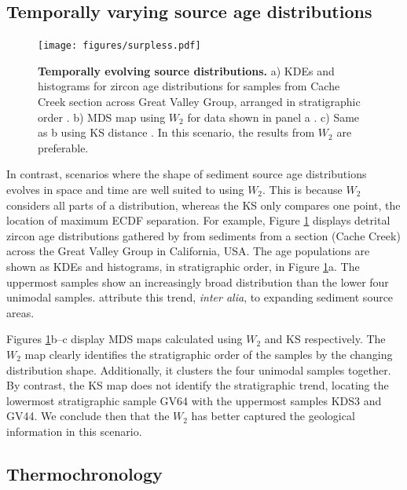 \documentclass[gchron, manuscript]{copernicus}
\providecommand{\DIFaddtex}[1]{{\protect\color{blue}\uwave{#1}}} %
\providecommand{\DIFaddFL}[1]{\DIFadd{#1}} %
\providecommand{\DIFaddbeginFL}{} %
\providecommand{\DIFaddendFL}{} %
\providecommand{\DIFadd}[1]{\texorpdfstring{\DIFaddtex{#1}}{#1}} %
\begin{document}
\subsection{Temporally varying source age distributions}

\begin{figure}
    \centering
    \texttt{[image: figures/surpless.pdf]}
    \caption{\textbf{Temporally evolving source distributions.} a) KDEs and histograms for zircon age distributions for samples from Cache Creek section across Great Valley Group, arranged in stratigraphic order \citep{degraaff-surpless_detrital_2002}. b) MDS map using $W_2$ for data shown in panel a \DIFaddbeginFL \DIFaddFL{(Stress = 0.28)}\DIFaddendFL . c) Same as b using KS distance \DIFaddbeginFL \DIFaddFL{(Stress = 0.18)}\DIFaddendFL . In this scenario, the results from $W_2$ are preferable. } 
    \label{fig:surpless}
\end{figure}

In contrast, scenarios where the shape of sediment source age distributions evolves in space and time are well suited to using $W_2$. This is because $W_2$ considers all parts of a distribution, whereas the KS only compares one point, the location of maximum ECDF separation. For example, Figure \ref{fig:surpless} displays detrital zircon age distributions gathered by \citet{degraaff-surpless_detrital_2002} from sediments from a section (Cache Creek) across the Great Valley Group in California, USA. The age populations are shown as KDEs and histograms, in stratigraphic order, in Figure \ref{fig:surpless}a. The uppermost samples show an increasingly broad distribution than the lower four unimodal samples. \citet{degraaff-surpless_detrital_2002} attribute this trend, \textit{inter alia}, to expanding sediment source areas. 

Figures \ref{fig:surpless}b--c display MDS maps calculated using $W_2$ and KS respectively. The $W_2$ map clearly identifies the stratigraphic order of the samples by the changing distribution shape. Additionally, it clusters the four unimodal samples together. By contrast, the KS map does not identify the stratigraphic trend, locating the lowermost stratigraphic sample GV64 with the uppermost samples KDS3 and GV44. We conclude then that the $W_2$ has better captured the geological information in this scenario.

\subsection{Thermochronology}
\end{document}
